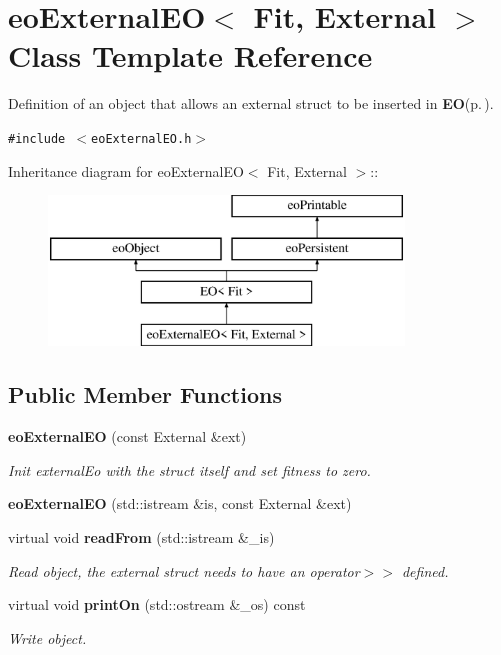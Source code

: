 \section{eo\-External\-EO$<$ Fit, External $>$ Class Template Reference}
\label{classeo_external_e_o}
Definition of an object that allows an external struct to be inserted in {\bf EO}{\rm (p.\,\pageref{class_e_o})}.  


{\tt \#include $<$eo\-External\-EO.h$>$}

Inheritance diagram for eo\-External\-EO$<$ Fit, External $>$::\begin{figure}[H]
\begin{center}
\leavevmode
\includegraphics[height=4cm]{classeo_external_e_o}
\end{center}
\end{figure}
\subsection*{Public Member Functions}
\begin{CompactItemize}
\item 
{\bf eo\-External\-EO} (const External \&ext)\label{classeo_external_e_o_a1}

\begin{CompactList}\small\item\em Init external\-Eo with the struct itself and set fitness to zero. \item\end{CompactList}\item 
{\bf eo\-External\-EO} (std::istream \&is, const External \&ext)\label{classeo_external_e_o_a2}

\item 
virtual void {\bf read\-From} (std::istream \&\_\-is)\label{classeo_external_e_o_a3}

\begin{CompactList}\small\item\em Read object, the external struct needs to have an operator$>$$>$ defined. \item\end{CompactList}\item 
virtual void {\bf print\-On} (std::ostream \&\_\-os) const 
\begin{CompactList}\small\item\em Write object. \item\end{CompactList}\end{CompactItemize}


